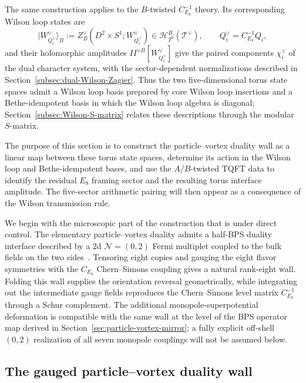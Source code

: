 \documentclass[11pt,a4paper]{article}
\numberwithin{equation}{section}
\begin{document}
The same construction applies to the $B$-twisted $C_{E_8}^{-1}$ theory.  Its corresponding Wilson loop states are
\begin{equation}
  |W^\vee_{Q_i^\vee}\rangle_{B}
  :=Z_{B}^{\vee}(D^2\times S^1;W^\vee_{Q_i^\vee})
  \in \mathscr H_{T^2}^{B}(\mathcal T^\vee),
  \qquad
  Q_i^\vee=C_{E_8}^{-1}Q_i,
  \label{eq:dual-solid-torus-Wilson-state}
\end{equation}
and their holomorphic amplitudes $I\!\!I^{\vee B}[W^\vee_{Q_i^\vee}]$ give the paired components $\chi_i^\vee$ of the dual character system, with the sector-dependent normalizations described in Section~\ref{subsec:dual-Wilson-Zagier}.  Thus the two five-dimensional torus state spaces admit a Wilson loop basis prepared by core Wilson loop insertions and a Bethe-idempotent basis in which the Wilson loop algebra is diagonal; Section~\ref{subsec:Wilson-S-matrix} relates these descriptions through the modular $S$-matrix.

The purpose of this section is to construct the particle--vortex duality wall as a linear map between these torus state spaces, determine its action in the Wilson loop and Bethe-idempotent bases, and use the $A/B$-twisted TQFT data to identify the residual $E_8$ framing sector and the resulting torus interface amplitude.  The five-sector arithmetic pairing will then appear as a consequence of the Wilson transmission rule.

We begin with the microscopic part of the construction that is under direct control.  The elementary particle--vortex duality admits a half-BPS duality interface described by a 2d $\mathcal N=(0,2)$ Fermi multiplet coupled to the bulk fields on the two sides~\cite{Dimofte:2017tpi}.  Tensoring eight copies and gauging the eight flavor symmetries with the $C_{E_8}$ Chern--Simons coupling gives a natural rank-eight wall.  Folding this wall supplies the orientation reversal geometrically, while integrating out the intermediate gauge fields reproduces the Chern--Simons level matrix $C_{E_8}^{-1}$ through a Schur complement.  The additional monopole-superpotential deformation is compatible with the same wall at the level of the BPS operator map derived in Section~\ref{sec:particle-vortex-mirror}; a fully explicit off-shell $(0,2)$ realization of all seven monopole couplings will not be assumed below.

\subsection{The gauged particle--vortex duality wall}
\label{subsec:gauged-pv-interface}
\end{document}
